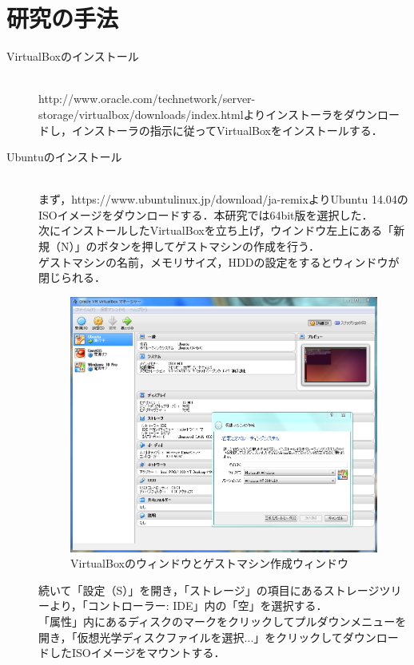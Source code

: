 \section{研究の手法}
\begin{description}
 \item[VirtualBoxのインストール]\mbox{}\\
 	http://www.oracle.com/technetwork/server-storage/virtualbox/downloads/index.htmlよりインストーラをダウンロードし，インストーラの指示に従ってVirtualBoxをインストールする．
 	
 \item[Ubuntuのインストール]\mbox{}\\
	まず，https://www.ubuntulinux.jp/download/ja-remixよりUbuntu 14.04のISOイメージをダウンロードする．本研究では64bit版を選択した．\\
	次にインストールしたVirtualBoxを立ち上げ，ウインドウ左上にある「新規（N）」のボタンを押してゲストマシンの作成を行う．\\
	ゲストマシンの名前，メモリサイズ，HDDの設定をするとウィンドウが閉じられる．
	
	\begin{figure}[H]
	\centering
	\includegraphics[width=15cm]{VBoxWindow.PNG}
	\caption{VirtualBoxのウィンドウとゲストマシン作成ウィンドウ}\label{VBoxSetup}
	\end{figure}
	
	続いて「設定（S）」を開き，「ストレージ」の項目にあるストレージツリーより，「コントローラー: IDE」内の「空」を選択する．\\%
	「属性」内にあるディスクのマークをクリックしてプルダウンメニューを開き，「仮想光学ディスクファイルを選択...」をクリックしてダウンロードしたISOイメージをマウントする．
	

\end{description}
